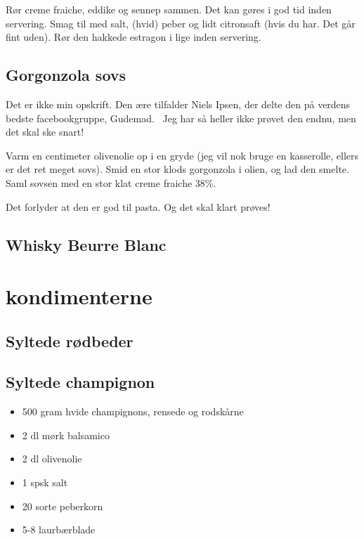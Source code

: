 \documentclass[
]{book}
\providecommand{\tightlist}{%
  \setlength{\itemsep}{0pt}\setlength{\parskip}{0pt}}
\begin{document}
Rør creme fraiche, eddike og sennep sammen. Det kan gøres i god tid inden servering. Smag til med salt, (hvid) peber og lidt citronsaft (hvis du har. Det går fint uden). Rør den hakkede estragon i lige inden servering.

\section{Gorgonzola sovs}\label{gorgonzola-sovs}

Det er ikke min opskrift. Den ære tilfalder Niels Ipsen, der delte den på verdens bedste facebookgruppe, Gudemad.~ Jeg har så heller ikke prøvet den endnu, men det skal ske snart!

Varm en centimeter olivenolie op i en gryde (jeg vil nok bruge en kasserolle, ellers er det ret meget sovs). Smid en stor klods gorgonzola i olien, og lad den smelte. Saml sovsen med en stor klat creme fraiche 38\%.

Det forlyder at den er god til pasta. Og det skal klart prøves!

\section{Whisky Beurre Blanc}\label{whisky-beurre-blanc}

\chapter{kondimenterne}\label{kondimenterne}

\section{Syltede rødbeder}\label{syltede-ruxf8dbeder}

\section{Syltede champignon}\label{syltede-champignon}

\begin{itemize}
\tightlist
\item
  500 gram hvide champignons, rensede og rodskårne
\item
  2 dl mørk balsamico
\item
  2 dl olivenolie
\item
  1 spsk salt
\item
  20 sorte peberkorn
\item
  5-8 laurbærblade
\end{itemize}
\end{document}
